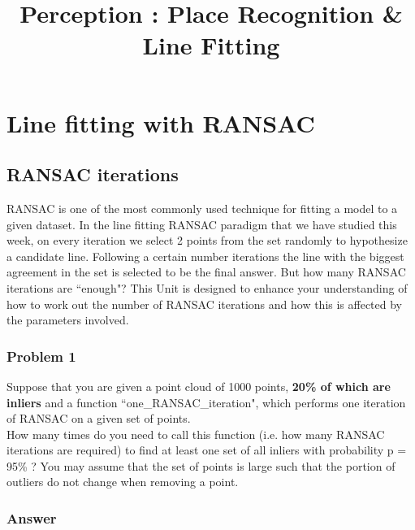 \documentclass[12pt]{article}
\begin{document}
 
 
\title{Perception : Place Recognition \& Line Fitting}
\date{\vspace{-20mm}}
\maketitle

\section*{Line fitting with RANSAC} 

\subsection*{RANSAC iterations}

RANSAC is one of the most commonly used technique for fitting a model to a given dataset. In the line fitting RANSAC paradigm that we have studied this week, on every iteration we select 2 points from the set randomly to hypothesize a candidate line. Following a certain number iterations the line with the biggest agreement in the set is selected to be the final answer. But how many RANSAC iterations are ``enough"? This Unit is designed to enhance your understanding of how to work out the number of RANSAC iterations and how this is affected by the parameters involved.

\subsubsection*{Problem 1}

Suppose that you are given a point cloud of 1000 points, \textbf{20\% of which are inliers} and a function ``one\_RANSAC\_iteration", which performs one iteration of RANSAC on a given set of points. \\

\noindent How many times do you need to call this function (i.e. how many RANSAC iterations are required) to find at least one set of all inliers with probability p = 95\% ? You may assume that the set of points is large such that the portion of outliers do not change when removing a point. \\ 


\subsubsection*{Answer}
\end{document}
